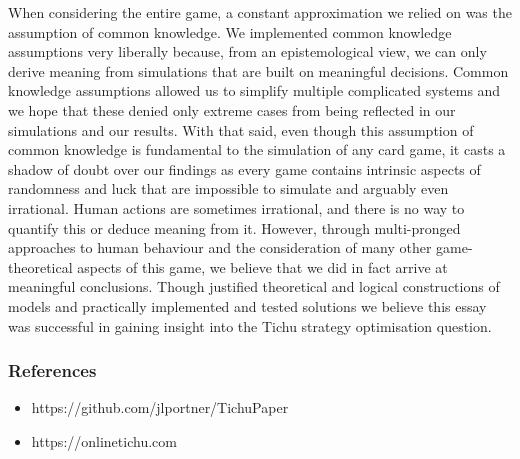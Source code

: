 When considering the entire game, a constant approximation we relied on was the assumption of common knowledge. We implemented common knowledge assumptions very liberally because, from an epistemological view, we can only derive meaning from simulations that are built on meaningful decisions. Common knowledge assumptions allowed us to simplify multiple complicated systems and we hope that these denied only extreme cases from being reflected in our simulations and our results. With that said, even though this assumption of common knowledge is fundamental to the simulation of any card game, it casts a shadow of doubt over our findings as every game contains intrinsic aspects of randomness and luck that are impossible to simulate and arguably even irrational. Human actions are sometimes irrational, and there is no way to quantify this or deduce meaning from it. However, through multi-pronged approaches to human behaviour and the consideration of many other game-theoretical aspects of this game, we believe that we did in fact arrive at meaningful conclusions. Though justified theoretical and logical constructions of models and practically implemented and tested solutions we believe this essay was successful in gaining insight into the Tichu strategy optimisation question.
\subsubsection{References}
\begin{itemize}
\item https://github.com/jlportner/TichuPaper \label{github}
\item https://onlinetichu.com
\end{itemize}


